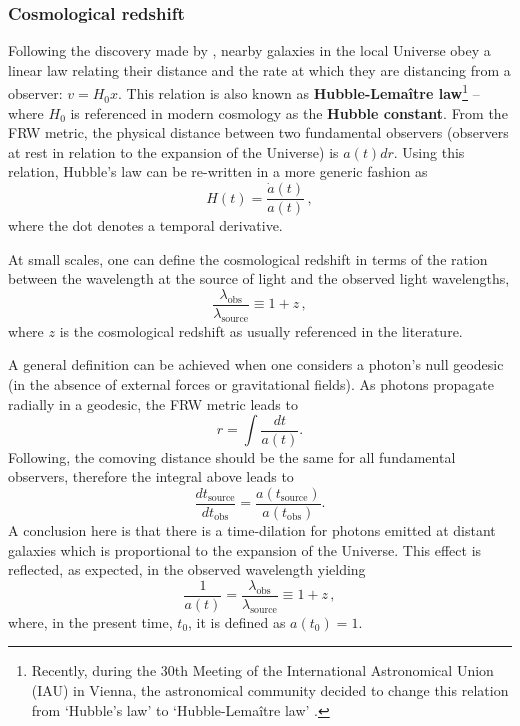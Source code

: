 \subsubsection{Cosmological redshift}
Following the discovery made by \cite{1929Hubble}, nearby galaxies in the local Universe obey a linear law relating their distance and the rate at which they are distancing from a observer: $v = H_0x$. This relation is also known as \textbf{Hubble-Lema\^itre law}\footnote{Recently, during the 30th Meeting of the International Astronomical Union (IAU) in Vienna, the astronomical community decided to change this relation from `Hubble's law' to `Hubble-Lemaître law' \citep{2018IAU-HubbleLemaitre}.} -- where $H_0$ is referenced in modern cosmology as the \textbf{Hubble constant}. From the FRW metric, the physical distance between two fundamental observers (observers at rest in relation to the expansion of the Universe) is $a(t)dr$. Using this relation, Hubble's law can be re-written in a more generic fashion as 
\begin{equation}
H(t) = \frac{\dot{a}(t)}{a(t)}\, ,
\end{equation}
where the dot denotes a temporal derivative. 

\qquad At small scales, one can define the cosmological redshift in terms of the ration between the wavelength at the source of light and the observed light wavelengths,
\begin{equation}
\frac{\lambda_{\text{obs}}}{\lambda_{\text{source}}}  \equiv 1 + z\, ,
\end{equation}
where $z$ is the cosmological redshift as usually referenced in the literature. 

\qquad A general definition can be achieved when one considers a photon's null geodesic (in the absence of external forces or gravitational fields). As photons propagate radially in a geodesic, the FRW metric leads to 
\begin{equation}
r = \int \frac{dt}{a(t)}.
\end{equation}
Following, the comoving distance should be the same for all fundamental observers, therefore the integral above leads to
\begin{equation}
\frac{dt_{\text{source}}}{dt_{\text{obs}}} = \frac{a(t_{\text{source}})}{a(t_{\text{obs}})}.
\end{equation}
A conclusion here is that there is a time-dilation for photons emitted at distant galaxies which is proportional to the expansion of the Universe. This effect is reflected, as expected, in the observed wavelength yielding
\begin{equation}
\frac{1}{a(t)} = \frac{\lambda_{\text{obs}}}{\lambda_{\text{source}}}  \equiv 1 + z \, ,
\end{equation}
where, in the present time, $t_0$, it is defined as $a(t_0) = 1$. 

